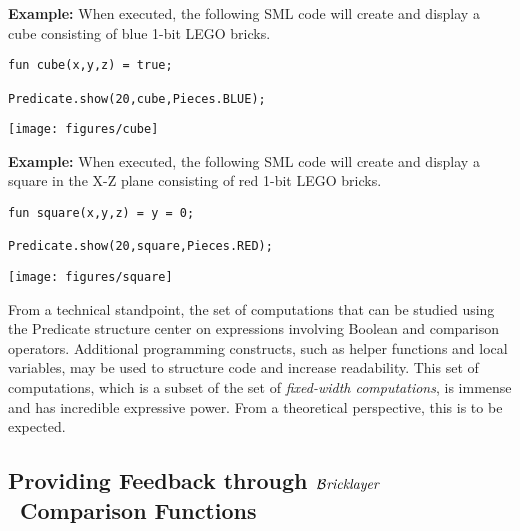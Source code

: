 \documentclass[submission,copyright,creativecommons]{eptcs}
\newcommand{\bricklayer}{\ensuremath{\mathcal{B}\emph{ricklayer}}}
\begin{document}
\textbf{Example:} When executed, the following SML code will create and display a  cube consisting of blue 1-bit LEGO bricks.

\medskip
\begin{minipage}[b]{3in}
\begin{lstlisting}
fun cube(x,y,z) = true;

Predicate.show(20,cube,Pieces.BLUE);
\end{lstlisting}
\end{minipage}
\hspace*{5mm}
\begin{minipage}{2in}
\texttt{[image: figures/cube]}
\end{minipage}

\bigskip
\textbf{Example:} When executed, the following SML code will create and display a  square in the X-Z plane consisting of red 1-bit LEGO bricks.

\medskip
\begin{minipage}[b]{3in}
\begin{lstlisting}
fun square(x,y,z) = y = 0;

Predicate.show(20,square,Pieces.RED);
\end{lstlisting}
\end{minipage}
\hspace*{5mm}
\begin{minipage}{2in}
\texttt{[image: figures/square]}
\end{minipage}


\medskip

From a technical standpoint, the set of computations that can be studied using the Predicate structure center on expressions involving Boolean and comparison operators. Additional programming constructs, such as helper functions and local variables, may be used to structure code and increase readability. This set of computations, which is a subset of the set of \emph{fixed-width computations}, is immense and has incredible expressive power. From a theoretical perspective, this is to be expected.

\subsection{Providing Feedback through \bricklayer\ Comparison Functions}
\end{document}
